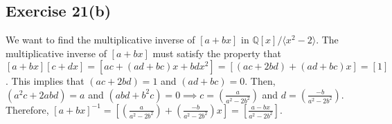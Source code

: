 \subsection*{Exercise 21(b)}
We want to find the multiplicative inverse of $[a+bx]$ in $\mathbb{Q}[x]/\langle x^2 - 2 \rangle$. The multiplicative inverse of $[a+bx]$ must satisfy the property that $[a+bx][c + dx] = [ac + (ad + bc)x + bdx^2] = [(ac + 2bd) + (ad + bc)x] = [1]$. This implies that $(ac + 2bd) = 1$ and $(ad + bc) = 0$. Then, $(a^2c + 2abd) = a$ and $(abd + b^2c) = 0 \implies c = (\frac{a}{a^2-2b^2})$ and $d = (\frac{-b}{a^2-2b^2})$. Therefore, $[a+bx]^{-1} = [(\frac{a}{a^2-2b^2}) + (\frac{-b}{a^2-2b^2})x] = [\frac{a - bx}{a^2-2b^2}]$.